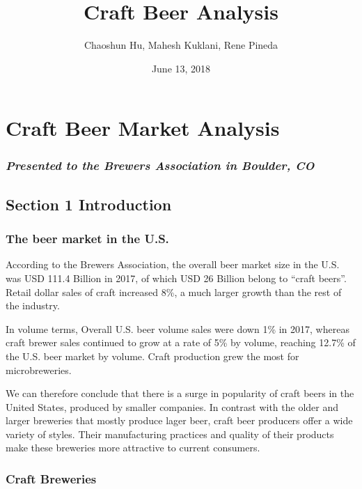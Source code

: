 \documentclass[]{article}
\title{Craft Beer Analysis}
\author{Chaoshun Hu, Mahesh Kuklani, Rene Pineda}
\date{June 13, 2018}
\begin{document}
\maketitle

\section{Craft Beer Market Analysis}\label{craft-beer-market-analysis}

\subsubsection{\texorpdfstring{\emph{Presented to the Brewers
Association in Boulder,
CO}}{Presented to the Brewers Association in Boulder, CO}}\label{presented-to-the-brewers-association-in-boulder-co}

\subsection{\texorpdfstring{\textbf{Section 1}
Introduction}{Section 1 Introduction}}\label{section-1-introduction}

\subsubsection{The beer market in the
U.S.}\label{the-beer-market-in-the-u.s.}

According to the Brewers Association, the overall beer market size in
the U.S. was USD 111.4 Billion in 2017, of which USD 26 Billion belong
to ``craft beers''. Retail dollar sales of craft increased 8\%, a much
larger growth than the rest of the industry.

In volume terms, Overall U.S. beer volume sales were down 1\% in 2017,
whereas craft brewer sales continued to grow at a rate of 5\% by volume,
reaching 12.7\% of the U.S. beer market by volume. Craft production grew
the most for microbreweries.

We can therefore conclude that there is a surge in popularity of craft
beers in the United States, produced by smaller companies. In contrast
with the older and larger breweries that mostly produce lager beer,
craft beer producers offer a wide variety of styles. Their manufacturing
practices and quality of their products make these breweries more
attractive to current consumers.

\subsubsection{Craft Breweries}\label{craft-breweries}
\end{document}

